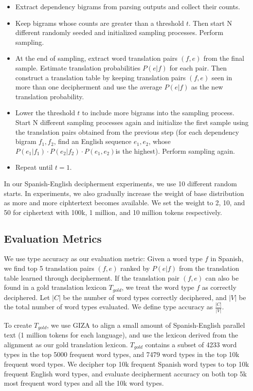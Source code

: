 \begin{itemize}
  \item Extract dependency bigrams from parsing outputs and collect their counts.
  \item Keep bigrams whose counts are greater than a threshold $t$. Then start N different randomly seeded and initialized sampling processes. Perform sampling.
  \item At the end of sampling, extract word translation pairs $(f,e)$ from the final sample. Estimate translation probabilities $P(e|f)$  for each pair. Then construct a translation table by keeping translation pairs $(f,e)$ seen in more than one decipherment and use the average $P(e|f)$ as the new translation probability.
  \item Lower the threshold $t$ to include more bigrams into the sampling process. Start N different sampling processes again and initialize the first sample using the translation pairs obtained from the previous step (for each dependency bigram $f_{1},f_{2}$, find an English sequence $e_{1},e_{2}$, whose $P(e_{1}|f_{1})\cdot P(e_{2}|f_{2})\cdot P(e_{1},e_{2})$is the highest). Perform sampling again.
  \item Repeat until $t=1$.
\end{itemize}

In our Spanish-English decipherment experiments, we use 10 different random starts. In experiments, we also gradually increase the weight of base distribution as more and more ciphtertext becomes available. We set the weight to 2, 10, and 50 for ciphertext with 100k, 1 million, and 10 million tokens respectively. 

\subsection{Evaluation Metrics}
We use type accuracy as our evaluation metric: Given a word type $f$ in Spanish, we find top 5 translation pairs $(f,e)$ ranked by $P(e|f)$ from the translation table learned through decipherment. If the translation pair $(f,e)$ can also be found in a gold translation lexicon $T_{gold}$, we treat the word type $f$ as correctly deciphered. Let $|C|$ be the number of word types correctly deciphered, and $|V|$ be the total number of word types evaluated. We define type accuracy as $\frac{|C|}{|V|}$.

To create $T_{gold}$, we use GIZA to align a small amount of Spanish-English parallel text (1 million tokens for each language), and use the lexicon derived from the alignment as our gold translation lexicon. $T_{gold}$ contains a subset of 4233 word types in the top 5000 frequent word types, and 7479 word types in the top 10k frequent word types. We decipher top 10k frequent Spanish word types to top 10k frequent English word types, and evaluate decipherment accuracy on both top 5k most frequent word types and all the 10k word types.

